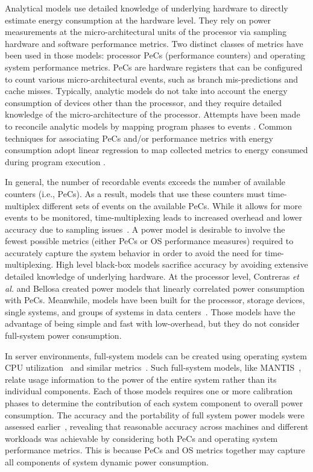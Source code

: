 Analytical models use detailed knowledge of underlying hardware to
directly estimate energy consumption at the hardware level.  They rely
on power measurements at the micro-architectural units of the processor
via sampling hardware and software performance metrics.  Two distinct
classes of metrics have been used in those models: processor PeCs
(performance counters) and operating system performance metrics.  PeCs
are hardware registers that can be configured to count various
micro-architectural events, such as branch mis-predictions and cache
misses.  Typically, analytic models do not take into account the energy
consumption of devices other than the processor, and they require
detailed knowledge of the micro-architecture of the processor.  Attempts
have been made to reconcile analytic models by mapping program phases to
events \cite{Isci2006}.  Common techniques for associating PeCs and/or
performance metrics with energy consumption adopt linear regression to
map collected metrics to energy consumed during program execution
\cite{Contreras2005,Economou2006,Isci2003b,Bircher2007,Lewis2008}.

In general, the number of recordable events exceeds the number of
available counters (i.e., PeCs).  As a result, models that use these
counters must time-multiplex different sets of events on the available
PeCs.  While it allows for more events to be monitored,
time-multiplexing leads to increased overhead and lower accuracy due to
sampling issues~\cite{Economou2006,Rivoire2008a}.  A power model
is desirable to involve the fewest possible metrics (either PeCs or OS
performance measures) required to accurately capture the system behavior
in order to avoid the need for time-multiplexing.  High level black-box
models sacrifice accuracy by avoiding extensive detailed knowledge of
underlying hardware.  At the processor level, Contreras \textit{et al.}
\citeyear{Contreras2005} and Bellosa \citeyear{Bellosa2003} created power models
that linearly correlated power consumption with PeCs.  Meanwhile, models
have been built for the processor, storage devices, single systems, and
groups of systems in data centers~\cite{Kadayif2001,Isci2003b}.
Those models have the advantage of being simple and fast with
low-overhead, but they do not consider full-system power consumption.

In server environments, full-system models can be created using
operating system CPU utilization~\cite{Fan2007} and similar
metrics~\cite{Heath2005}. Such full-system models, like
MANTIS~\cite{Economou2006,Rivoire2008a}, relate usage information
to the power of the entire system rather than its individual components.
Each of those models requires one or more calibration phases to
determine the contribution of each system component to overall power
consumption.  The accuracy and the portability of full system power
models were assessed earlier~\cite{Rivoire2008b}, revealing that
reasonable accuracy across machines and different workloads was
achievable by considering both PeCs and operating system performance
metrics.  This is because PeCs and OS metrics together may capture all
components of system dynamic power consumption.

